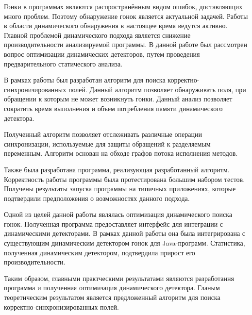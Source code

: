 \startconclusionpage

Гонки в программах являются распространённым видом ошибок, доставляющих много проблем. Поэтому обнаружение гонок является актуальной задачей. Работы в области динамического обнаружения в настоящее время ведутся активно. Главной проблемой динамического подхода является снижение производительности анализируемой программы.
В данной работе был рассмотрен вопрос оптимизации динамических детекторов, путем проведения предварительного  статического анализа.

В рамках работы был разработан алгоритм для поиска корректно-синхронизированных полей. Данный алгоритм позволяет обнаруживать поля, при обращении к которым не может возникнуть гонки. Данный анализ позволяет сократить время выполнения и объем потребления памяти динамического детектора.

Полученный алгоритм позволяет отслеживать различные операции синхронизации, используемые для защиты обращений к разделяемым переменным. Алгоритм основан на обходе графов потока исполнения методов. 

Также была разработана программа, реализующая разработанный алгоритм. 
Корректность работы программы была протестирована большим набором тестов. Получены результаты запуска программы на типичных приложениях, которые подтвердили предположения о возможностях данного подхода.

Одной из целей данной работы являлась оптимизация динамического поиска гонок. Полученная программа предоставляет интерфейс для интеграции с динамическими детекторами. В рамках данной работы она была интегрирована с существующим динамическим детектором гонок для Java-программ. Статистика, полученная динамическим детектором, подтвердила 
прирост его производительности.  

Таким образом, главными практческими результатами являются разработання программа и полученная оптимизация динамического детектора. Гланым теоретическим результатом является предложенный алгоритм для поиска корректно-синхронизированных полей. 

\FloatBarrier
